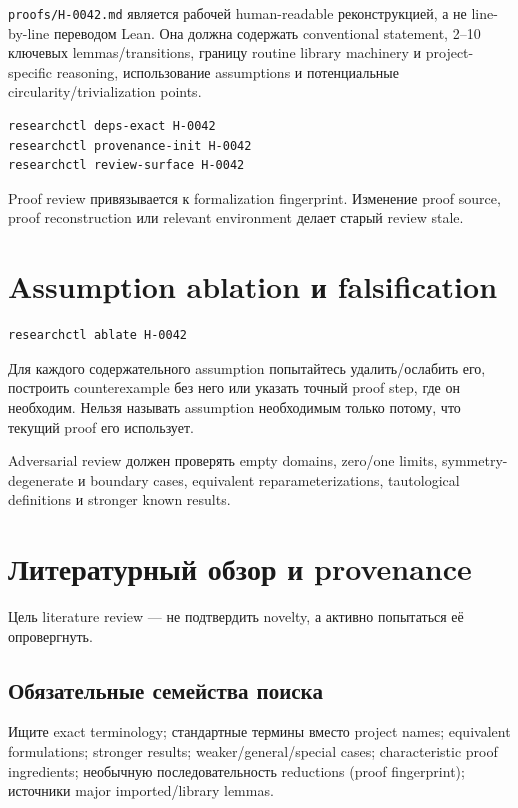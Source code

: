 \documentclass[11pt,a4paper]{article}
\begin{document}
\texttt{proofs/H-0042.md} является рабочей human-readable реконструкцией, а не line-by-line переводом Lean. Она должна содержать conventional statement, 2--10 ключевых lemmas/transitions, границу routine library machinery и project-specific reasoning, использование assumptions и потенциальные circularity/trivialization points.

\begin{lstlisting}
researchctl deps-exact H-0042
researchctl provenance-init H-0042
researchctl review-surface H-0042
\end{lstlisting}

Proof review привязывается к formalization fingerprint. Изменение proof source, proof reconstruction или relevant environment делает старый review stale.

\section{Assumption ablation и falsification}

\begin{lstlisting}
researchctl ablate H-0042
\end{lstlisting}

Для каждого содержательного assumption попытайтесь удалить/ослабить его, построить counterexample без него или указать точный proof step, где он необходим. Нельзя называть assumption необходимым только потому, что текущий proof его использует.

Adversarial review должен проверять empty domains, zero/one limits, symmetry-degenerate и boundary cases, equivalent reparameterizations, tautological definitions и stronger known results.

\section{Литературный обзор и provenance}

\begin{principle}
Цель literature review --- не подтвердить novelty, а активно попытаться её опровергнуть.
\end{principle}

\subsection{Обязательные семейства поиска}

Ищите exact terminology; стандартные термины вместо project names; equivalent formulations; stronger results; weaker/general/special cases; characteristic proof ingredients; необычную последовательность reductions (proof fingerprint); источники major imported/library lemmas.
\end{document}
